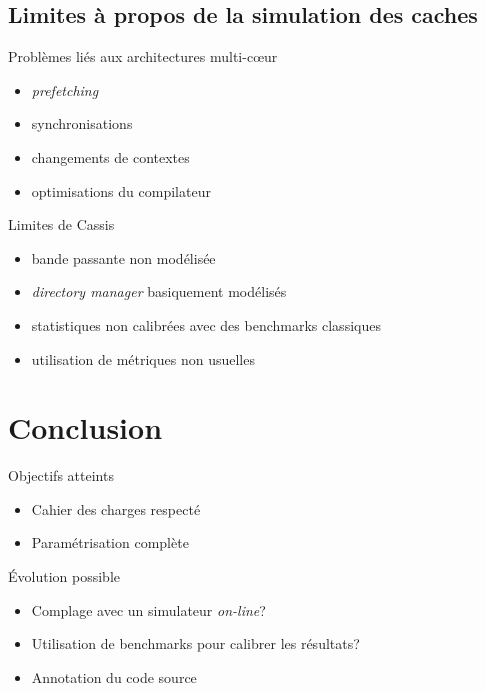 \subsection{Limites \`a  propos de la simulation des caches}
\begin{frame}
  \begin{block}{Probl\`emes li\'es aux architectures multi-c{\oe}ur}
    \begin{itemize}
      \item \emph{prefetching}
      \item synchronisations
      \item changements de contextes 
      \item optimisations du compilateur
    \end{itemize}
  \end{block}
  \begin{block}{Limites de Cassis}
    \begin{itemize}
      \item bande passante non mod\'elis\'ee
      \item \emph{directory manager} basiquement mod\'elis\'es
      \item statistiques non calibr\'ees avec des benchmarks classiques
      \item utilisation de m\'etriques non usuelles
    \end{itemize}
  \end{block}
\end{frame}


\section*{Conclusion}
\begin{frame}
  \begin{block}{Objectifs atteints}
    \begin{itemize}
      \item Cahier des charges respect\'e
      \item Param\'etrisation compl\`ete
    \end{itemize}
  \end{block}

  \begin{block}{\'Evolution possible}
    \begin{itemize}
      \item Complage avec un simulateur \emph{on-line}?
      \item Utilisation de benchmarks pour calibrer les r\'esultats?
      \item Annotation du code source
    \end{itemize}
  \end{block}
\end{frame}
